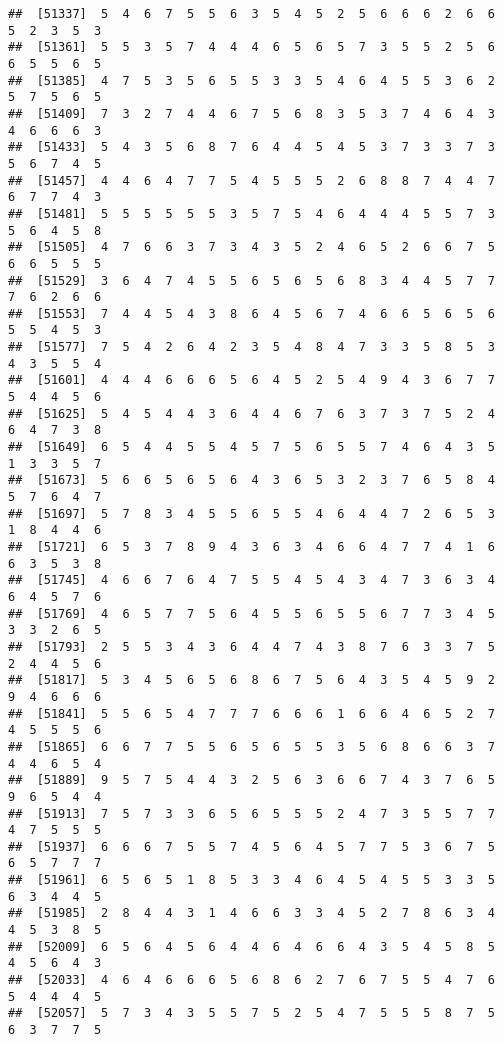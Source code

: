 \documentclass[
]{book}
\begin{document}
\begin{verbatim}
##  [51337]  5  4  6  7  5  5  6  3  5  4  5  2  5  6  6  6  2  6  6  5  2  3  5  3
##  [51361]  5  5  3  5  7  4  4  4  6  5  6  5  7  3  5  5  2  5  6  6  5  5  6  5
##  [51385]  4  7  5  3  5  6  5  5  3  3  5  4  6  4  5  5  3  6  2  5  7  5  6  5
##  [51409]  7  3  2  7  4  4  6  7  5  6  8  3  5  3  7  4  6  4  3  4  6  6  6  3
##  [51433]  5  4  3  5  6  8  7  6  4  4  5  4  5  3  7  3  3  7  3  5  6  7  4  5
##  [51457]  4  4  6  4  7  7  5  4  5  5  5  2  6  8  8  7  4  4  7  6  7  7  4  3
##  [51481]  5  5  5  5  5  5  3  5  7  5  4  6  4  4  4  5  5  7  3  5  6  4  5  8
##  [51505]  4  7  6  6  3  7  3  4  3  5  2  4  6  5  2  6  6  7  5  6  6  5  5  5
##  [51529]  3  6  4  7  4  5  5  6  5  6  5  6  8  3  4  4  5  7  7  7  6  2  6  6
##  [51553]  7  4  4  5  4  3  8  6  4  5  6  7  4  6  6  5  6  5  6  5  5  4  5  3
##  [51577]  7  5  4  2  6  4  2  3  5  4  8  4  7  3  3  5  8  5  3  4  3  5  5  4
##  [51601]  4  4  4  6  6  6  5  6  4  5  2  5  4  9  4  3  6  7  7  5  4  4  5  6
##  [51625]  5  4  5  4  4  3  6  4  4  6  7  6  3  7  3  7  5  2  4  6  4  7  3  8
##  [51649]  6  5  4  4  5  5  4  5  7  5  6  5  5  7  4  6  4  3  5  1  3  3  5  7
##  [51673]  5  6  6  5  6  5  6  4  3  6  5  3  2  3  7  6  5  8  4  5  7  6  4  7
##  [51697]  5  7  8  3  4  5  5  6  5  5  4  6  4  4  7  2  6  5  3  1  8  4  4  6
##  [51721]  6  5  3  7  8  9  4  3  6  3  4  6  6  4  7  7  4  1  6  6  3  5  3  8
##  [51745]  4  6  6  7  6  4  7  5  5  4  5  4  3  4  7  3  6  3  4  6  4  5  7  6
##  [51769]  4  6  5  7  7  5  6  4  5  5  6  5  5  6  7  7  3  4  5  3  3  2  6  5
##  [51793]  2  5  5  3  4  3  6  4  4  7  4  3  8  7  6  3  3  7  5  2  4  4  5  6
##  [51817]  5  3  4  5  6  5  6  8  6  7  5  6  4  3  5  4  5  9  2  9  4  6  6  6
##  [51841]  5  5  6  5  4  7  7  7  6  6  6  1  6  6  4  6  5  2  7  4  5  5  5  6
##  [51865]  6  6  7  7  5  5  6  5  6  5  5  3  5  6  8  6  6  3  7  4  4  6  5  4
##  [51889]  9  5  7  5  4  4  3  2  5  6  3  6  6  7  4  3  7  6  5  9  6  5  4  4
##  [51913]  7  5  7  3  3  6  5  6  5  5  5  2  4  7  3  5  5  7  7  4  7  5  5  5
##  [51937]  6  6  6  7  5  5  7  4  5  6  4  5  7  7  5  3  6  7  5  6  5  7  7  7
##  [51961]  6  5  6  5  1  8  5  3  3  4  6  4  5  4  5  5  3  3  5  6  3  4  4  5
##  [51985]  2  8  4  4  3  1  4  6  6  3  3  4  5  2  7  8  6  3  4  4  5  3  8  5
##  [52009]  6  5  6  4  5  6  4  4  6  4  6  6  4  3  5  4  5  8  5  4  5  6  4  3
##  [52033]  4  6  4  6  6  6  5  6  8  6  2  7  6  7  5  5  4  7  6  5  4  4  4  5
##  [52057]  5  7  3  4  3  5  5  7  5  2  5  4  7  5  5  5  8  7  5  6  3  7  7  5

\end{verbatim}
\end{document}
